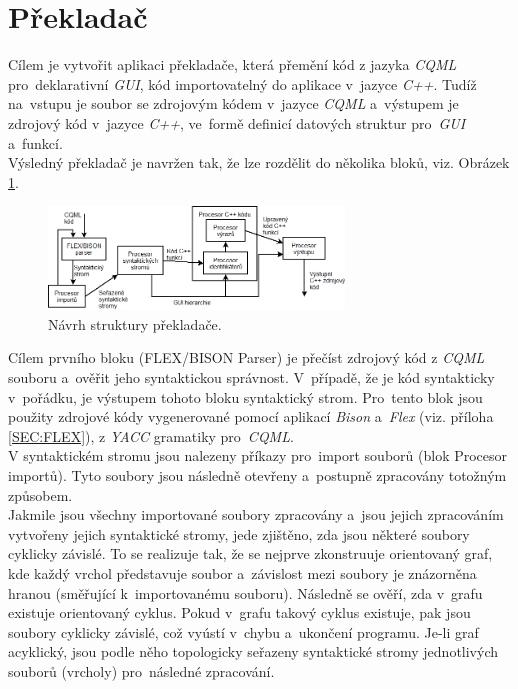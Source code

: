 \documentclass[11pt,twoside,a4paper]{book}
\begin{document}
\section{Překladač}
Cílem je vytvořit aplikaci překladače, která přemění kód z jazyka \textit{CQML} pro~deklarativní \textit{GUI}, kód importovatelný do aplikace v~jazyce \textit{C++}. Tudíž na~vstupu je soubor se zdrojovým kódem v~jazyce \textit{CQML} a~výstupem je zdrojový kód v~jazyce \textit{C++}, ve~formě definicí datových struktur pro~\textit{GUI} a~funkcí. \\
Výsledný překladač je navržen tak, že lze rozdělit do několika bloků, viz. Obrázek \ref{fig:fig1}.\\
\begin{figure}[!ht]
\begin{center}
  \includegraphics[width=0.7\textwidth]{figures/parserdiag}
\caption{{\label{fig:fig1}}Návrh struktury překladače.}
\end{center}
\end{figure}
Cílem prvního bloku (FLEX/BISON Parser) je přečíst zdrojový kód z \textit{CQML} souboru a~ověřit jeho syntaktickou správnost. V~případě, že je kód syntakticky v~pořádku, je výstupem tohoto bloku syntaktický strom. Pro~tento blok jsou použity zdrojové kódy vygenerované pomocí aplikací \textit{Bison} a~\textit{Flex} (viz. příloha \ref{SEC:FLEX}), z \textit{YACC} gramatiky pro~\textit{CQML}.\\
V syntaktickém stromu jsou nalezeny příkazy pro~import souborů (blok Procesor importů). Tyto soubory jsou následně otevřeny a~postupně zpracovány totožným způsobem.\\
Jakmile jsou všechny importované soubory zpracovány a~jsou jejich zpracováním vytvořeny jejich syntaktické stromy, jede zjištěno, zda jsou některé soubory cyklicky závislé. To se realizuje tak, že se nejprve zkonstruuje orientovaný graf, kde každý vrchol představuje soubor a~závislost mezi soubory je znázorněna hranou (směřující k~importovanému souboru). Následně se ověří, zda v~grafu existuje orientovaný cyklus. Pokud v~grafu takový cyklus existuje, pak jsou soubory cyklicky závislé, což vyústí v~chybu a~ukončení programu. Je-li graf acyklický, jsou podle něho topologicky seřazeny syntaktické stromy jednotlivých souborů (vrcholy) pro~následné zpracování.\\ %
\end{document}
